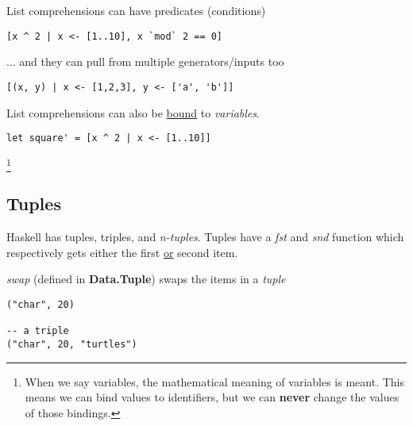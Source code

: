 List comprehensions can have predicates (conditions)
\begin{verbatim}
[x ^ 2 | x <- [1..10], x `mod` 2 == 0]
\end{verbatim}

... and they can pull from multiple generators/inputs too
\begin{verbatim}
[(x, y) | x <- [1,2,3], y <- ['a', 'b']]
\end{verbatim}

List comprehensions can also be \underline{bound} to \emph{variables}.
\begin{lstlisting}
let square' = [x ^ 2 | x <- [1..10]]
\end{lstlisting}

\footnote{
    When we say variables, the mathematical meaning of variables is meant.
    This means we can bind values to identifiers, but we can \textbf{never} change the values of those bindings.
}

\subsection{Tuples}
Haskell has tuples, triples, and \emph{n-tuples}. Tuples have a \emph{fst} and \emph{snd} function which
respectively gets either the first \underline{or} second item. 

\emph{swap} (defined in \textbf{Data.Tuple}) swaps the items in a \emph{tuple}

\begin{lstlisting}
("char", 20)

-- a triple
("char", 20, "turtles")
\end{lstlisting}